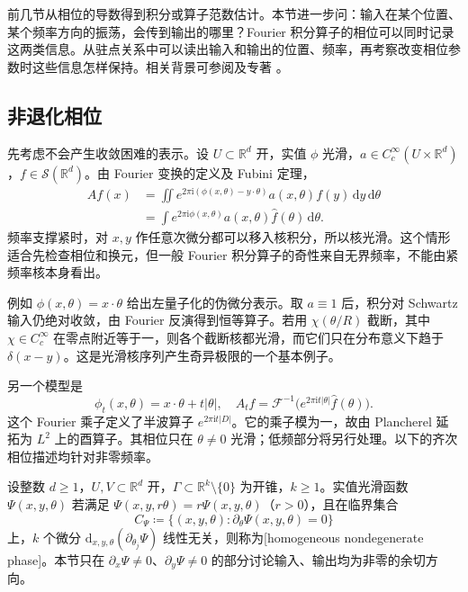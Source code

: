 
前几节从相位的导数得到积分或算子范数估计。本节进一步问：输入在某个位置、某个频率方向的振荡，会传到输出的哪里？Fourier 积分算子的相位可以同时记录这两类信息。从驻点关系中可以读出输入和输出的位置、频率，再考察改变相位参数时这些信息怎样保持。相关背景可参阅及专著 \cite{Hrmander2009AnalysisIV}。

\subsection{非退化相位}
\label{b2:subsec:210501}

先考虑不会产生收敛困难的表示。设 \(U\subset\mathbb R^d\) 开，实值 \(\phi\) 光滑，\(a\in C_c^\infty(U\times\mathbb R^d)\)，\(f\in\mathcal S(\mathbb R^d)\)。由 Fourier 变换的定义及 Fubini 定理，
\[
 \begin{aligned}
 Af(x)
 &=\iint e^{2\pi\mathrm i(\phi(x,\theta)-y\cdot\theta)}
          a(x,\theta)f(y)\,\mathrm dy\,\mathrm d\theta\\
 &=\int e^{2\pi\mathrm i\phi(x,\theta)}
          a(x,\theta)\widehat f(\theta)\,\mathrm d\theta.
 \end{aligned}
\]
频率支撑紧时，对 \(x,y\) 作任意次微分都可以移入核积分，所以核光滑。这个情形适合先检查相位和换元，但一般 Fourier 积分算子的奇性来自无界频率，不能由紧频率核本身看出。

\ProseParagraphBreak
例如 \(\phi(x,\theta)=x\cdot\theta\) 给出左量子化的伪微分表示。取 \(a\equiv1\) 后，积分对 Schwartz 输入仍绝对收敛，由 Fourier 反演得到恒等算子。若用 \(\chi(\theta/R)\) 截断，其中 \(\chi\in C_c^\infty\) 在零点附近等于一，则各个截断核都光滑，而它们只在分布意义下趋于 \(\delta(x-y)\)。这是光滑核序列产生奇异极限的一个基本例子。

\ProseParagraphBreak
另一个模型是
\[
 \phi_t(x,\theta)=x\cdot\theta+t|\theta|,
 \quad
 A_tf=\mathcal F^{-1}\bigl(e^{2\pi\mathrm i t|\theta|}\widehat f(\theta)\bigr).
\]
这个 Fourier 乘子定义了半波算子 \(e^{2\pi\mathrm i t|D|}\)。它的乘子模为一，故由 Plancherel 延拓为 \(L^2\) 上的酉算子。其相位只在 \(\theta\ne0\) 光滑；低频部分将另行处理。以下的齐次相位描述均针对非零频率。

\begin{definition}[齐次非退化相位]\label{b2:def:21-nondegenerate-phase}
设整数 \(d\ge1\)，\(U,V\subset\mathbb R^d\) 开，\(\Gamma\subset\mathbb R^k\setminus\{0\}\) 为开锥，\(k\ge1\)。实值光滑函数 \(\Psi(x,y,\theta)\) 若满足
\(\Psi(x,y,r\theta)=r\Psi(x,y,\theta)\)（\(r>0\)），且在临界集合
\[
 C_\Psi\coloneqq\{(x,y,\theta):\partial_\theta\Psi(x,y,\theta)=0\}
\]
上，\(k\) 个微分
\(\mathrm d_{x,y,\theta}(\partial_{\theta_j}\Psi)\)
线性无关，则称为[homogeneous nondegenerate phase]。本节只在
\(\partial_x\Psi\ne0\)、\(\partial_y\Psi\ne0\)
的部分讨论输入、输出均为非零的余切方向。
\end{definition}

